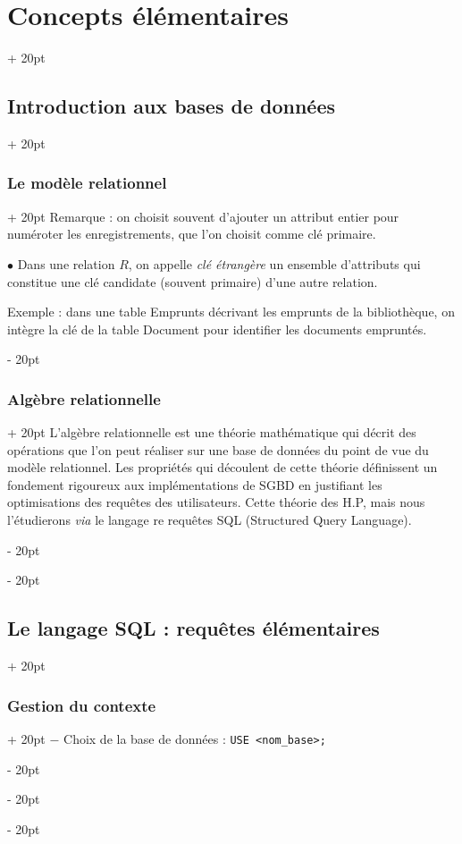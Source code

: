 \documentclass[a4paper, 12pt, twoside]{article}
\newcommand{\ind}[1][20pt]{\advance\leftskip + #1}
\newcommand{\deind}[1][20pt]{\advance\leftskip - #1}
\newenvironment{indt}[2][20pt]{#2 \par \ind[#1]}{\par \deind} %
\begin{document}
\begin{indt}{\section{Concepts élémentaires}}
\begin{indt}{\subsection{Introduction aux bases de données}}
\begin{indt}{\subsubsection{Le modèle relationnel}}
                Remarque : on choisit souvent d'ajouter un attribut entier pour numéroter les enregistrements, que l'on choisit comme clé primaire.
                
                \vspace{12pt}
                
                $\bullet$ Dans une relation $R$, on appelle \textit{clé étrangère} un ensemble d'attributs qui constitue une clé candidate (souvent primaire) d'une autre relation.
                
                \vspace{6pt}
                
                Exemple : dans une table Emprunts décrivant les emprunts de la bibliothèque, on intègre la clé de la table Document pour identifier les documents empruntés.
            \end{indt}
            
            \vspace{12pt}
            
            \begin{indt}{\subsubsection{Algèbre relationnelle}}
                L'algèbre relationnelle est une théorie mathématique qui décrit des opérations que l'on peut réaliser sur une base de données du point de vue du modèle relationnel. Les propriétés qui découlent de cette théorie définissent un fondement rigoureux aux implémentations de SGBD en justifiant les optimisations des requêtes des utilisateurs. Cette théorie des H.P, mais nous l'étudierons \textit{via} le langage re requêtes SQL (Structured Query Language).
            \end{indt}
        \end{indt}
        
        \begin{indt}{\subsection{Le langage SQL : requêtes élémentaires}}
            \begin{indt}{\subsubsection{Gestion du contexte}}
                $-$ Choix de la base de données : \texttt{USE <nom\_base>;}
                

\end{indt}
\end{indt}
\end{indt}
\end{document}
